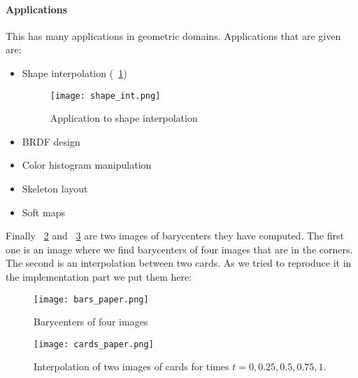 \paragraph{Applications}
This has many applications in geometric domains. Applications that are given are:
\begin{itemize}
	\item Shape interpolation (\figurename~\ref{shape})
		\begin{figure}[h]
			\centering
			\texttt{[image: shape\_int.png]}
			\caption{Application to shape interpolation}
			\label{shape}
		\end{figure}
	\item BRDF design
	\item Color histogram manipulation
	\item Skeleton layout
	\item Soft maps
\end{itemize}
Finally \figurename~\ref{barp} and \figurename~\ref{cardp} are two images of barycenters they have computed. The first one is an image where we find barycenters of four images that are in the corners. The second is an interpolation between two cards. As we tried to reproduce it in the implementation part we put them here:

\begin{figure}[h]
	\centering
	\texttt{[image: bars\_paper.png]}
	\caption{Barycenters of four images}
	\label{barp}
\end{figure}
\begin{figure}[h]
	\centering
	\texttt{[image: cards\_paper.png]}
	\caption{Interpolation of two images of cards for times $t = 0, 0.25, 0.5, 0.75, 1$.}
	\label{cardp}
\end{figure}
